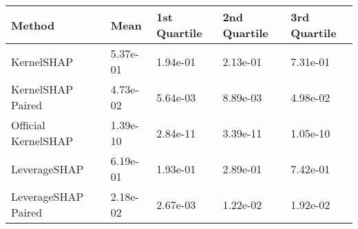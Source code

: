 \begin{tabular}{lllll}
  \toprule
  \textbf{Method} & \textbf{Mean} & \textbf{1st Quartile} & \textbf{2nd Quartile} & \textbf{3rd Quartile} \\ \midrule 
KernelSHAP & 5.37e-01 & 1.94e-01 & 2.13e-01 & 7.31e-01\\
KernelSHAP Paired & \cellcolor{bronze!60}4.73e-02 & \cellcolor{bronze!60}5.64e-03 & \cellcolor{silver!60}8.89e-03 & \cellcolor{bronze!60}4.98e-02\\
Official KernelSHAP & \cellcolor{gold!60}1.39e-10 & \cellcolor{gold!60}2.84e-11 & \cellcolor{gold!60}3.39e-11 & \cellcolor{gold!60}1.05e-10\\
LeverageSHAP & 6.19e-01 & 1.93e-01 & 2.89e-01 & 7.42e-01\\
LeverageSHAP Paired & \cellcolor{silver!60}2.18e-02 & \cellcolor{silver!60}2.67e-03 & \cellcolor{bronze!60}1.22e-02 & \cellcolor{silver!60}1.92e-02\\
\bottomrule
\end{tabular}